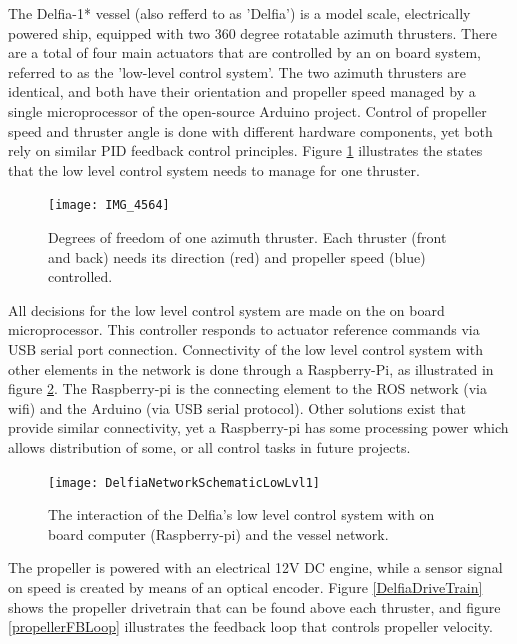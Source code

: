 The Delfia-1* vessel (also refferd to as 'Delfia') is a model scale, electrically powered ship, equipped with two 360 degree rotatable azimuth thrusters. There are a total of four main actuators that are controlled by an on board system, referred to as the 'low-level control system'. The two azimuth thrusters are identical, and both have their orientation and propeller speed managed by a single microprocessor of the open-source Arduino project. Control of propeller speed and thruster angle is done with different hardware components, yet both rely on similar PID feedback control principles. Figure \ref{DelfiaDOF} illustrates the states that the low level control system needs to manage for one thruster. 

\begin{figure}[h!]
	\centering
	\texttt{[image: IMG\_4564]}
	\caption{Degrees of freedom of one azimuth thruster. Each thruster (front and back) needs its direction (red) and propeller speed (blue) controlled.}
	\label{DelfiaDOF}
\end{figure}
All decisions for the low level control system are made on the on board microprocessor. This controller responds to actuator reference commands via USB serial port connection. Connectivity of the low level control system with other elements in the network is done through a Raspberry-Pi, as illustrated in figure \ref{delfiaConnectionNW}. The Raspberry-pi is the connecting element to the ROS network (via wifi) and the Arduino (via USB serial protocol). Other solutions exist that provide similar connectivity, yet a Raspberry-pi has some processing power which allows distribution of some, or all control tasks in future projects. 

\begin{figure}[H]
	\centering
	\texttt{[image: DelfiaNetworkSchematicLowLvl1]}
	\caption{The interaction of the Delfia's low level control system with on board computer (Raspberry-pi) and the vessel network.}
	\label{delfiaConnectionNW}
\end{figure}

The propeller is powered with an electrical 12V DC engine, while a sensor signal on speed is created by means of an optical encoder. Figure \ref{DelfiaDriveTrain} shows the propeller drivetrain that can be found above each thruster, and figure \ref{propellerFBLoop} illustrates the feedback loop that controls propeller velocity. 

